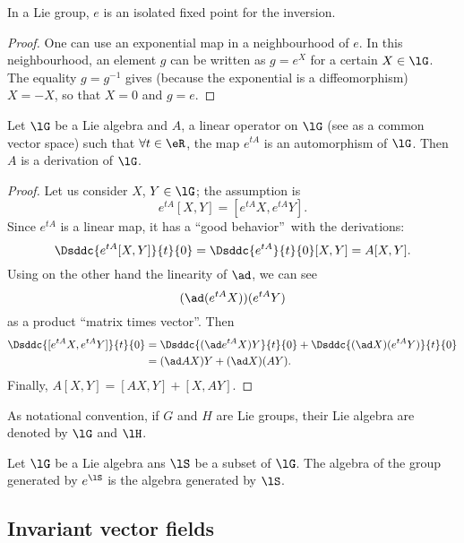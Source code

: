 \begin{lemma}
In a Lie group, $e$ is an isolated fixed point for the inversion.
\end{lemma}

\begin{proof}
One can use an exponential map in a neighbourhood of $e$. In this neighbourhood, an element $g$ can be written as $g=e^X$ for a certain $X\in\lG$. The equality $g=g^{-1}$ gives (because the exponential is a diffeomorphism) $X=-X$, so that $X=0$ and $g=e$.
\end{proof}

\begin{lemma}
Let $\lG$ be a Lie algebra and $A$, a linear operator on $\lG$ (see as a common vector space) such that $\forall t\in\eR$, the map $e^{tA}$ is an automorphism of $\lG$. Then $A$ is a derivation of $\lG$.
\label{lem:autom_derr}
\end{lemma}

\begin{proof}
Let us consider $X$, $Y\in\lG$;  the assumption is 
\[
  e^{tA}[X,Y]=[e^{tA}X,e^{tA}Y]. 
\]
Since $e^{tA}$ is a linear map, it has a ``good behavior''\ with the derivations: 
\[
\Dsddc{e^{tA}[X,Y]}{t}{0}=\Dsddc{e^{tA}}{t}{0}[X,Y]=A[X,Y].
\]
Using on the other hand the linearity of $\ad$, we can see
\[
  (\ad(e^{tA}X))(e^{tA}Y)
\]
as a product ``matrix times vector''. Then
\begin{equation}
\begin{split}
  \Dsddc{[e^{tA}X,e^{tA}Y]}{t}{0}&=\Dsddc{(\ad e^{tA}X)Y}{t}{0}+\Dsddc{(\ad X)(e^{tA}Y)}{t}{0}\\
                                 &=(\ad AX)Y+(\ad X)(AY).
\end{split}
\end{equation}
Finally, $A[X,Y]=[AX,Y]+[X,AY]$.

\end{proof}

As notational convention, if $G$ and $H$ are Lie groups, their Lie algebra are denoted by $\lG$ and $\lH$.

\begin{lemma}		\label{LemAlgEtGroupesGenere}
	Let $\lG$ be a Lie algebra ans $\lS$ be a subset of $\lG$. The algebra of the group generated by $ e^{\lS}$ is the algebra generated by $\lS$.
\end{lemma}

\subsection{Invariant vector fields}

